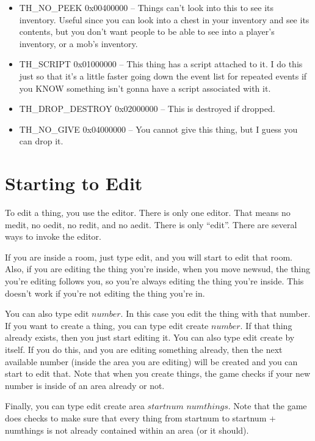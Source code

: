 \begin{itemize}
\item TH\_NO\_PEEK          0x00400000   -- Things can't look into this to see its inventory. Useful since you can look into a chest in your inventory and see its contents, but you don't want people to be able to see into a player's inventory, or a mob's inventory.

\item TH\_SCRIPT           0x01000000   -- This thing has a script  attached to it. I do this just so that it's a little faster going down the event list for repeated events if you KNOW something isn't gonna have a script associated with it.

\item TH\_DROP\_DESTROY     0x02000000   -- This is destroyed if dropped. 

\item TH\_NO\_GIVE          0x04000000   -- You cannot give this thing, but I guess you can drop it.

\end{itemize}



\section{Starting to Edit}

To edit a thing, you use the editor. There is only one editor. That
means no medit, no oedit, no redit, and no aedit. There is only
``edit''. There are several ways to invoke the editor.

If you are inside a room, just type edit, and you will start to edit
that room. Also, if you are editing the thing you're inside, when you
move newsud, the thing you're editing follows you, so you're always
editing the thing you're inside. This doesn't work if you're not
editing the thing you're in.

You can also type edit $number$. In this case you edit the thing with
that number. If you want to create a thing, you can type edit create
$number$. If that thing already exists, then you just start editing
it. You can also type edit create by itself. If you do this, and you
are editing something already, then the next available number (inside
the area you are editing) will be created and you can start to edit
that. Note that when you create things, the game checks if your new
number is inside of an area already or not.

Finally, you can type edit create area $startnum$ $numthings$. Note
that the game does checks to make sure that every thing from startnum
to startnum + numthings is not already contained within an area (or it
should).

